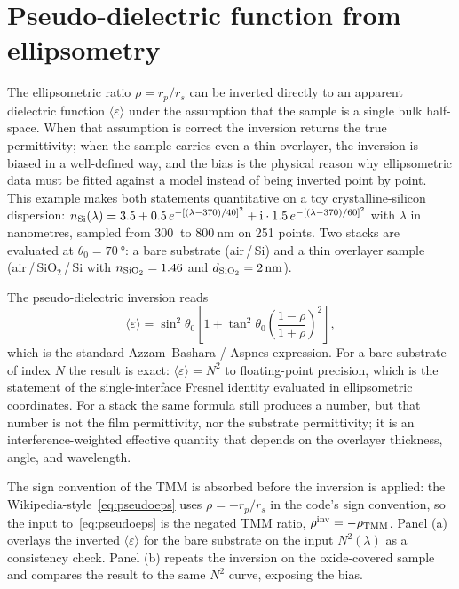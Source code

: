 \section{Pseudo-dielectric function from ellipsometry}

The ellipsometric ratio $\rho = r_p/r_s$ can be inverted directly to an
apparent dielectric function $\langle\varepsilon\rangle$ under the
assumption that the sample is a single bulk half-space. When that
assumption is correct the inversion returns the true permittivity; when
the sample carries even a thin overlayer, the inversion is biased in a
well-defined way, and the bias is the physical reason why ellipsometric
data must be fitted against a model instead of being inverted point by
point. This example makes both statements quantitative on a toy
crystalline-silicon dispersion:
$n_{\rm Si}(\lambda) = 3.5 + 0.5\,e^{-[(\lambda - 370)/40]^{2}}
+ \mathrm{i} \cdot 1.5\,e^{-[(\lambda - 370)/60]^{2}}$ with $\lambda$ in
nanometres, sampled from $\SI{300}{}$ to $\SI{800}{\nano\metre}$ on 251
points. Two stacks are evaluated at $\theta_0 = \SI{70}{\degree}$: a bare
substrate (air\,/\,Si) and a thin overlayer sample (air\,/\,SiO$_2$\,/\,Si
with $n_{\rm SiO_2} = 1.46$ and $d_{\rm SiO_2} = \SI{2}{\nano\metre}$).

The pseudo-dielectric inversion reads
\begin{equation}
  \langle\varepsilon\rangle = \sin^{2}\theta_0\left[1 + \tan^{2}\theta_0\left(\frac{1-\rho}{1+\rho}\right)^{2}\right], \label{eq:pseudoeps}
\end{equation}
which is the standard Azzam--Bashara / Aspnes expression. For
a bare substrate of index $N$ the result is exact:
$\langle\varepsilon\rangle = N^{2}$ to floating-point precision, which is
the statement of the single-interface Fresnel identity evaluated in
ellipsometric coordinates. For a stack the same formula still produces a
number, but that number is not the film permittivity, nor the substrate
permittivity; it is an interference-weighted effective quantity that
depends on the overlayer thickness, angle, and wavelength.

The sign convention of the TMM is absorbed before the inversion is
applied: the Wikipedia-style~\eqref{eq:pseudoeps} uses $\rho = -r_p/r_s$
in the code's sign convention, so the input to~\eqref{eq:pseudoeps} is the
negated TMM ratio, $\rho^{\rm inv} = -\rho_{\rm TMM}$. Panel (a)
overlays the inverted $\langle\varepsilon\rangle$ for the bare substrate
on the input $N^{2}(\lambda)$ as a consistency check. Panel (b) repeats
the inversion on the oxide-covered sample and compares the result to the
same $N^{2}$ curve, exposing the bias.

